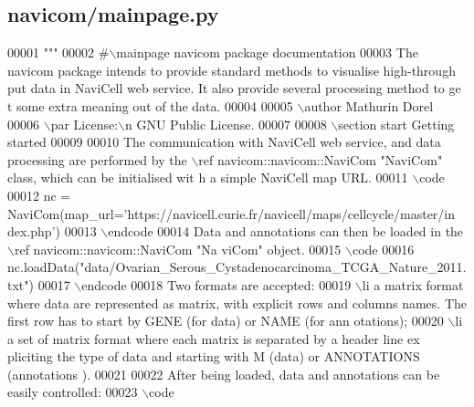 \hypertarget{mainpage_8py_source}{
\subsection{navicom/mainpage.py}
}

\begin{DoxyCode}
00001 \textcolor{stringliteral}{"""}
00002 \textcolor{stringliteral}{#\(\backslash\)mainpage navicom package documentation}
00003 \textcolor{stringliteral}{The navicom package intends to provide standard methods to visualise high-through
      put data in NaviCell web service. It also provide several processing method to ge
      t some extra meaning out of the data.}
00004 \textcolor{stringliteral}{}
00005 \textcolor{stringliteral}{\(\backslash\)author Mathurin Dorel}
00006 \textcolor{stringliteral}{\(\backslash\)par License:\(\backslash\)n GNU Public License.}
00007 \textcolor{stringliteral}{}
00008 \textcolor{stringliteral}{\(\backslash\)section start Getting started}
00009 \textcolor{stringliteral}{}
00010 \textcolor{stringliteral}{The communication with NaviCell web service, and data processing are performed by
       the \(\backslash\)ref navicom::navicom::NaviCom "NaviCom" class, which can be initialised wit
      h a simple NaviCell map URL.}
00011 \textcolor{stringliteral}{\(\backslash\)code}
00012 \textcolor{stringliteral}{nc = NaviCom(map\_url='https://navicell.curie.fr/navicell/maps/cellcycle/master/in
      dex.php')}
00013 \textcolor{stringliteral}{\(\backslash\)endcode}
00014 \textcolor{stringliteral}{Data and annotations can then be loaded in the \(\backslash\)ref navicom::navicom::NaviCom "Na
      viCom" object.}
00015 \textcolor{stringliteral}{\(\backslash\)code}
00016 \textcolor{stringliteral}{nc.loadData("data/Ovarian\_Serous\_Cystadenocarcinoma\_TCGA\_Nature\_2011.txt")}
00017 \textcolor{stringliteral}{\(\backslash\)endcode}
00018 \textcolor{stringliteral}{Two formats are accepted:}
00019 \textcolor{stringliteral}{    \(\backslash\)li a matrix format where data are represented as matrix, with explicit rows 
      and columns names. The first row has to start by GENE (for data) or NAME (for ann
      otations);}
00020 \textcolor{stringliteral}{    \(\backslash\)li a set of matrix format where each matrix is separated by a header line ex
      pliciting the type of data and starting with M (data) or ANNOTATIONS (annotations
      ).}
00021 \textcolor{stringliteral}{}
00022 \textcolor{stringliteral}{After being loaded, data and annotations can be easily controlled:}
00023 \textcolor{stringliteral}{\(\backslash\)code}

\end{DoxyCode}
